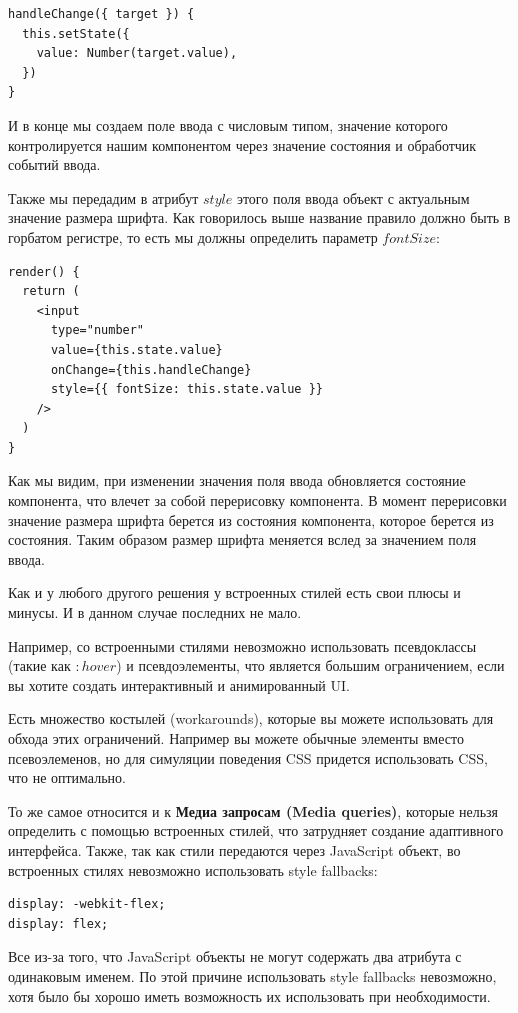 \begin{lstlisting}
handleChange({ target }) {
  this.setState({
    value: Number(target.value),
  })
}
\end{lstlisting}

И в конце мы создаем поле ввода с числовым типом, значение которого контролируется нашим компонентом через значение состояния и обработчик событий ввода.

Также мы передадим в атрибут $style$ этого поля ввода объект с актуальным значение размера шрифта. Как говорилось выше название правило должно быть в горбатом регистре, то есть мы должны определить параметр $fontSize$:

\begin{lstlisting}
render() {
  return (
    <input
      type="number"
      value={this.state.value}
      onChange={this.handleChange}
      style={{ fontSize: this.state.value }}
    />
  )
}
\end{lstlisting}

Как мы видим, при изменении значения поля ввода обновляется состояние компонента, что влечет за собой перерисовку компонента. В момент перерисовки значение размера шрифта берется из состояния компонента, которое берется из состояния. Таким образом размер шрифта меняется вслед за значением поля ввода. 

Как и у любого другого решения у встроенных стилей есть свои плюсы и минусы. И в данном случае последних не мало.

Например, со встроенными стилями невозможно использовать псевдоклассы (такие как $:hover$) и псевдоэлементы, что является большим ограничением, если вы хотите создать интерактивный и анимированный UI.

Есть множество костылей (workarounds), которые вы можете использовать для обхода этих ограничений. Например вы можете обычные элементы вместо псевоэлеменов, но для симуляции поведения CSS придется использовать CSS, что не оптимально.

То же самое относится и к \textbf{Медиа запросам (Media queries)}, которые нельзя определить с помощью встроенных стилей, что затрудняет создание адаптивного интерфейса. Также, так как стили передаются через JavaScript объект, во встроенных стилях невозможно использовать style fallbacks:

\begin{lstlisting}
display: -webkit-flex;
display: flex;
\end{lstlisting}

Все из-за того, что JavaScript объекты не могут содержать два атрибута с одинаковым именем. По этой причине использовать style fallbacks невозможно, хотя было бы хорошо иметь возможность их использовать при необходимости.


